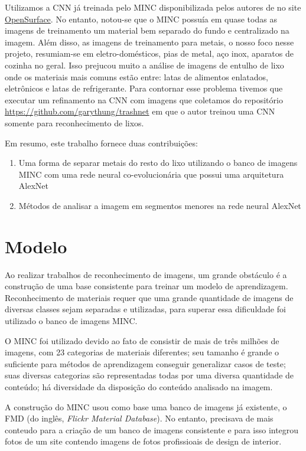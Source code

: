 \documentclass[conference, compsoc, 12pt]{IEEEtran}
\begin{document}
Utilizamos a CNN já treinada pelo MINC disponibilizada pelos autores de \cite{Artigo principal} no site \href{http://opensurfaces.cs.cornell.edu/publications/minc/>}{OpenSurface}. No entanto, notou-se que o MINC possuía em quase todas as imagens de treinamento um material bem separado do fundo e centralizado na imagem. Além disso, as imagens de treinamento para metais, o nosso foco nesse projeto, resumiam-se em eletro-domésticos, pias de metal, aço inox, aparatos de cozinha no geral. Isso prejucou muito a análise de imagens de entulho de lixo onde os materiais mais comuns estão entre: latas de alimentos enlatados, eletrônicos e latas de refrigerante. Para contornar esse problema tivemos que executar um refinamento na CNN com imagens que coletamos do repositório \href{https://github.com/garythung/trashnet}{https://github.com/garythung/trashnet} em que o autor treinou uma CNN somente para reconhecimento de lixos.

Em resumo, este trabalho fornece duas contribuições:

\begin{enumerate}
    \item Uma forma de separar metais do resto do lixo utilizando o banco de imagens MINC com uma rede neural co-evolucionária que possui uma arquitetura AlexNet
    \item Métodos de analisar a imagem em segmentos menores na rede neural AlexNet
\end{enumerate}


\section{Modelo}

Ao realizar trabalhos de reconhecimento de imagens, um grande obstáculo é a construção de uma base consistente para
treinar um modelo de aprendizagem. Reconhecimento de materiais requer que uma grande quantidade de imagens de diversas classes
sejam separadas e utilizadas, para superar essa dificuldade foi utilizado o banco de imagens MINC.

O MINC foi utilizado devido ao fato de consistir de mais de três milhões de imagens, com 23 categorias de materiais diferentes;
seu tamanho é grande o suficiente para métodos de aprendizagem conseguir generalizar casos de teste; suas diversas categorias
são representadas todas por uma diversa quantidade de conteúdo; há diversidade da disposição do conteúdo analisado na imagem.

A construção do MINC usou como base uma banco de imagens já existente, o FMD (do inglês, \textit{Flickr Material Database}). No entanto,
precisava de mais conteudo para a criação de um banco de imagens consistente e para isso integrou fotos de um site contendo imagens
de fotos profissioais de design de interior.
\end{document}
